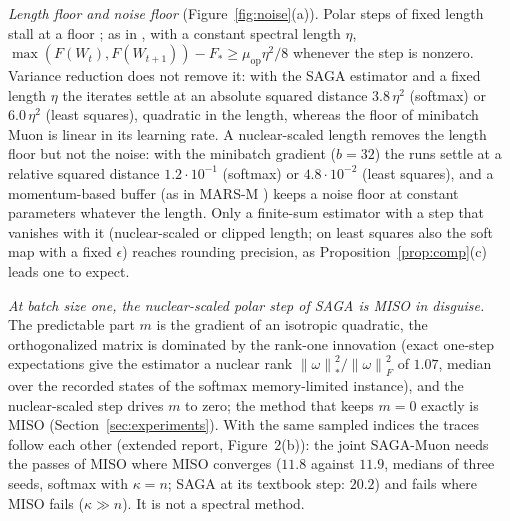 \documentclass[10pt]{article}
\makeatletter
\renewcommand\section{\@startsection{section}{1}{\z@}{-2.4ex \@plus -0.6ex \@minus -.2ex}{1.2ex \@plus .2ex}{\normalfont\large\bfseries}}
\theoremstyle{remark}
\newcommand{\nnuc}[1]{\left\|#1\right\|_{*}}
\newcommand{\nF}[1]{\left\|#1\right\|_{F}}
\newcommand{\muop}{\mu_{\mathrm{op}}}
\makeatother
\begin{document}
\begin{description}[leftmargin=2.3em,labelwidth=2.0em,labelsep=0.3em,itemsep=1pt,topsep=3pt,parsep=0pt,font=\normalfont\bfseries]
\item[(M1)] \emph{Length floor and noise floor} (Figure~\ref{fig:noise}(a)). Polar steps of fixed length stall at a
floor \cite{lau2025polargrad,jawanpuria2026constant}; as in \cite[Lemma~4]{jawanpuria2026constant}, with a constant spectral length $\eta$,
$\max(F(W_t),F(W_{t+1}))-F_\ast\ge\muop\eta^2/8$ whenever the step is nonzero. Variance reduction does not remove
it: with the SAGA estimator and a fixed length $\eta$ the iterates settle at an absolute squared distance $3.8\,\eta^2$
(softmax) or $6.0\,\eta^2$ (least squares), quadratic in the length, whereas the floor of minibatch Muon is linear in its
learning rate. A nuclear-scaled length removes the length floor but not the noise: with the minibatch gradient ($b=32$)
the runs settle at a relative squared distance $1.2\cdot10^{-1}$ (softmax) or $4.8\cdot10^{-2}$ (least squares), and a
momentum-based buffer (as in MARS-M \cite{liu2025marsm}) keeps a noise floor at constant parameters whatever the length.
Only a finite-sum estimator with a step that vanishes with it (nuclear-scaled or clipped length; on least squares also
the soft map with a fixed $\epsilon$) reaches rounding precision, as Proposition~\ref{prop:comp}(c) leads one to expect.
\item[(M2)] \emph{At batch size one, the nuclear-scaled polar step of SAGA is MISO in disguise.} The predictable part $m$ is the gradient of an isotropic quadratic, the orthogonalized
matrix is dominated by the rank-one innovation (exact one-step expectations give the estimator a nuclear rank
$\nnuc\omega^2/\nF\omega^2$ of $1.07$, median over the recorded states of the softmax memory-limited instance), and the
nuclear-scaled step drives $m$ to zero; the method that keeps $m=0$ exactly is MISO (Section~\ref{sec:experiments}).
With the same sampled indices the traces follow each other (extended report, Figure~2(b)): the joint SAGA-Muon needs the passes of MISO where MISO
converges ($11.8$ against $11.9$, medians of three seeds, softmax with $\kappa=n$; SAGA at its textbook step: $20.2$)
and fails where MISO fails ($\kappa\gg n$). It is not a spectral method.
\end{description}

\section{Discussion}\label{sec:discussion}
\end{document}
